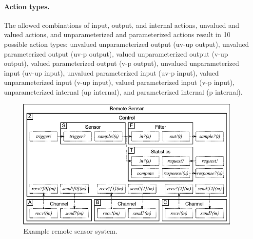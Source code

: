 \paragraph{Action types.}
The allowed combinations of input, output, and internal actions, unvalued and valued actions, and unparameterized and parameterized actions result in 10 possible action types:
unvalued unparameterized output (uv-up output),
unvalued parameterized output (uv-p output),
valued unparameterized output (v-up output),
valued parameterized output (v-p output),
unvalued unparameterized input (uv-up input),
unvalued parameterized input (uv-p input),
valued unparameterized input (v-up input),
valued parameterized input (v-p input),
unparameterized internal (up internal), and
parameterized internal (p internal).

\begin{figure}
\center
\includegraphics[width=\textwidth]{example1}
\caption{Example remote sensor system.}
\label{example1}
\end{figure}

